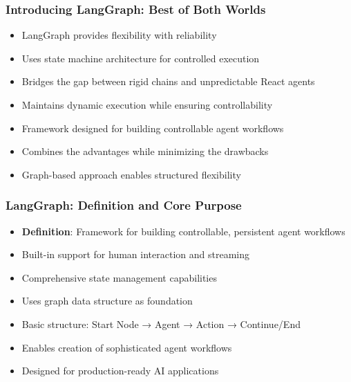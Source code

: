 \begin{frame}[fragile]\frametitle{Introducing LangGraph: Best of Both Worlds}
      \begin{itemize}
        \item LangGraph provides flexibility with reliability
        \item Uses state machine architecture for controlled execution
        \item Bridges the gap between rigid chains and unpredictable React agents
        \item Maintains dynamic execution while ensuring controllability
        \item Framework designed for building controllable agent workflows
        \item Combines the advantages while minimizing the drawbacks
        \item Graph-based approach enables structured flexibility
      \end{itemize}
\end{frame}

\begin{frame}[fragile]\frametitle{LangGraph: Definition and Core Purpose}
      \begin{itemize}
        \item \textbf{Definition}: Framework for building controllable, persistent agent workflows
        \item Built-in support for human interaction and streaming
        \item Comprehensive state management capabilities
        \item Uses graph data structure as foundation
        \item Basic structure: Start Node → Agent → Action → Continue/End
        \item Enables creation of sophisticated agent workflows
        \item Designed for production-ready AI applications
      \end{itemize}
\end{frame}


